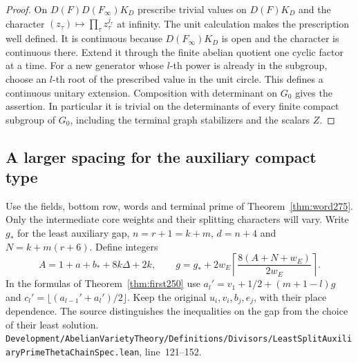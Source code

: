 \documentclass[a4paper,11pt]{article}
\theoremstyle{definition}
\theoremstyle{remark}
\newcommand{\srcloc}[2]{{\small\nolinkurl{#1.lean}}, line~#2}
\numberwithin{equation}{section}
\begin{document}
\begin{proof}
On \(D(F)D(F_\infty)K_D\) prescribe trivial values on
\(D(F)K_D\) and the character
\((z_\tau)\mapsto\prod_\tau z_\tau^{j_\tau}\) at infinity.
The unit calculation makes the prescription well defined.
It is continuous because \(D(F_\infty)K_D\) is open and the
character is continuous there. Extend it through the finite
abelian quotient one cyclic factor at a time. For a new
generator whose \(l\)-th power is already in the subgroup,
choose an \(l\)-th root of the prescribed value in the unit
circle. This defines a continuous unitary extension.
Composition with determinant on \(G_0\) gives the assertion.
In particular it is trivial on the determinants of every
finite compact subgroup of \(G_0\), including the terminal
graph stabilizers and the scalars \(Z\).
\end{proof}

\subsection{A larger spacing for the auxiliary compact type}\label{nav:V-43}
Use the fields, bottom row, words and terminal prime of
Theorem~\ref{thm:word275}. Only the intermediate core weights
and their splitting characters will vary. Write \(g_*\) for
the least auxiliary gap, \(n=r+1=k+m\), \(d=n+4\) and
\(N=k+m(r+6)\). Define integers
\[
 A=1+a+b_*+8k\Delta+2k,\qquad
 g=g_*+2w_E\left\lceil\frac{8(A+N+w_E)}{2w_E}\right\rceil .
\]
In the formulas of Theorem~\ref{thm:first250} use
\(a_l'=v_1+1/2+(m+1-l)g\) and
\(c_l'=\lfloor(a_{l-1}'+a_l')/2\rfloor\).
Keep the original \(u_i,v_i,b_j,e_j\), with their place
dependence. The source distinguishes the inequalities on
the gap from the choice of their least solution.
\srcloc{Development/AbelianVarietyTheory/Definitions/Divisors/LeastSplitAuxiliaryPrimeThetaChainSpec}{121--152}.
\end{document}
